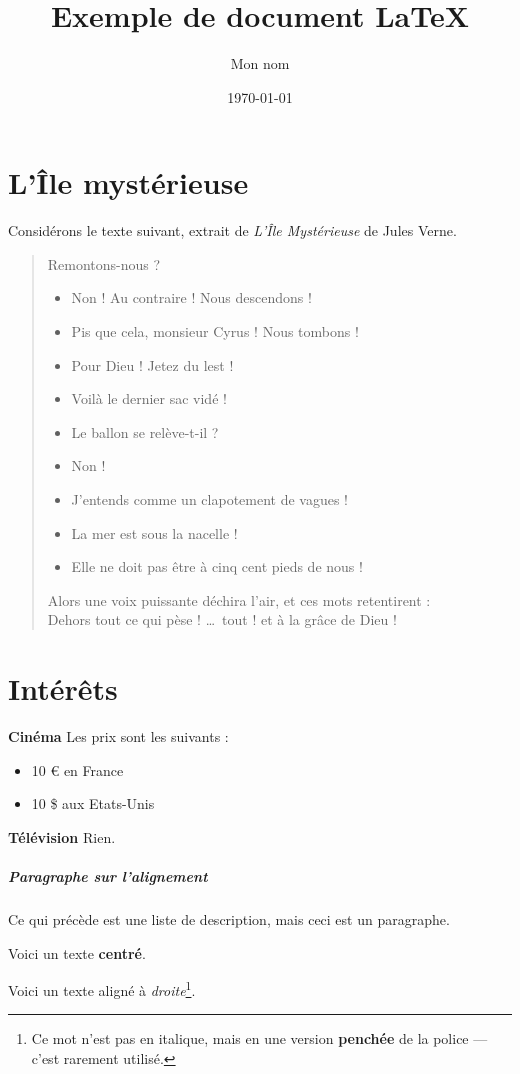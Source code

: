 \documentclass{article}
\title{\textbf{Exemple de document \LaTeX}}
\author{Mon nom}
\date{\today}
\begin{document}
\maketitle

\raggedright\section{L'Île mystérieuse}
Considérons le texte suivant, extrait de \textit{L'Île Mystérieuse} de Jules Verne. \\
\begin{quotation}
\og Remontons-nous ?
\begin{itemize}
    \item Non ! Au contraire ! Nous descendons !
    \item Pis que cela, monsieur Cyrus ! Nous tombons !
    \item Pour Dieu ! Jetez du lest !   
    \item Voilà le dernier sac vidé !
    \item Le ballon se relève-t-il ? 
    \item Non !
    \item J’entends comme un clapotement de vagues !
    \item La mer est sous la nacelle !
    \item Elle ne doit pas être à cinq cent pieds de nous !\fg
\end{itemize}

Alors une voix puissante déchira l'air, et ces mots retentirent :\\
\og Dehors tout ce qui pèse ! \ldots ~tout ! et à la grâce de Dieu !\fg
\end{quotation}

\section{Intérêts}
\indent\textbf{Cinéma} Les prix sont les suivants :
\begin{itemize}
    \item 10 € en France
    \item 10 \$ aux Etats-Unis
\end{itemize}

\indent\textbf{Télévision} Rien.

\subparagraph*{Paragraphe sur l'alignement} Ce qui précède est une liste de description, mais ceci est un paragraphe.
\begin{center}
    Voici un texte \textbf{centré}.
\end{center}
\raggedleft Voici un texte aligné à \textsl{droite}\footnote{Ce mot n'est pas en italique, mais en une version \textbf{penchée} de la police --- c'est rarement utilisé.}.
\end{document}
